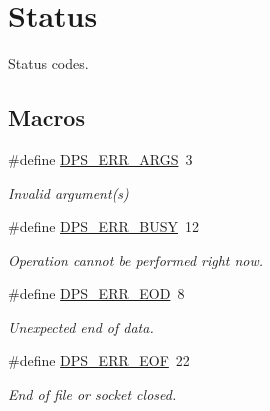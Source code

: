 \hypertarget{group__status}{}\section{Status}
\label{group__status}


Status codes.  


\subsection*{Macros}
\begin{DoxyCompactItemize}
\item 
\mbox{\label{group__status_gab7ef2498c212cd215dcd710c534b44bb}} 
\#define \hyperlink{group__status_gab7ef2498c212cd215dcd710c534b44bb}{D\+P\+S\+\_\+\+E\+R\+R\+\_\+\+A\+R\+GS}~3
\begin{DoxyCompactList}\small\item\em Invalid argument(s) \end{DoxyCompactList}\item 
\mbox{\label{group__status_ga6170fba8d741b70a1f4c7e8662beceea}} 
\#define \hyperlink{group__status_ga6170fba8d741b70a1f4c7e8662beceea}{D\+P\+S\+\_\+\+E\+R\+R\+\_\+\+B\+U\+SY}~12
\begin{DoxyCompactList}\small\item\em Operation cannot be performed right now. \end{DoxyCompactList}\item 
\mbox{\label{group__status_gabace0ae959b833d5df1d81ad45cb43b9}} 
\#define \hyperlink{group__status_gabace0ae959b833d5df1d81ad45cb43b9}{D\+P\+S\+\_\+\+E\+R\+R\+\_\+\+E\+OD}~8
\begin{DoxyCompactList}\small\item\em Unexpected end of data. \end{DoxyCompactList}\item 
\mbox{\label{group__status_ga40b286792608c99ed5dffd1caca9f569}} 
\#define \hyperlink{group__status_ga40b286792608c99ed5dffd1caca9f569}{D\+P\+S\+\_\+\+E\+R\+R\+\_\+\+E\+OF}~22
\begin{DoxyCompactList}\small\item\em End of file or socket closed. \end{DoxyCompactList}\item 

\end{DoxyCompactItemize}
